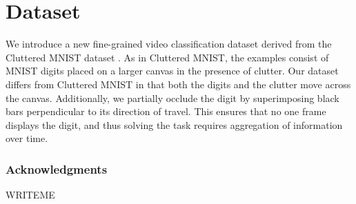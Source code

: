 \documentclass{article} %
\begin{document}
\section{Dataset}

We introduce a new fine-grained video classification dataset derived from the Cluttered MNIST dataset \cite{clutteredmnist}.
As in Cluttered MNIST, the examples consist of MNIST digits placed on a larger canvas in the presence of clutter.
Our dataset differs from Cluttered MNIST in that both the digits and the clutter move across the canvas.
Additionally, we partially occlude the digit by superimposing black bars perpendicular to its direction of travel.
This ensures that no one frame displays the digit, and thus solving the task requires aggregation of information over time.

\subsubsection*{Acknowledgments}

WRITEME



\end{document}
